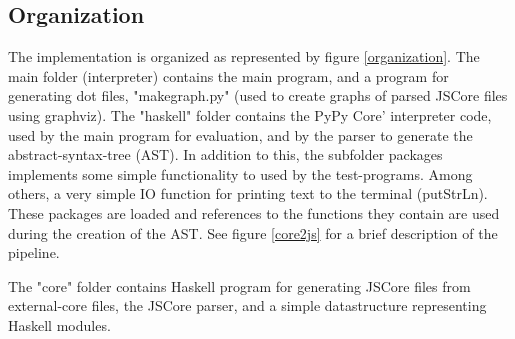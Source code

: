 




\subsection{Organization}

The implementation is organized as represented by figure \ref{organization}. The
main folder (interpreter) contains the main program, and a program for generating
dot files, "makegraph.py" (used to create graphs of parsed JSCore files using graphviz). 
The "haskell" folder
contains the PyPy Core' interpreter code, used by the main program for evaluation, 
and by the parser to generate the abstract-syntax-tree (AST). In addition to this,
the subfolder packages implements some simple functionality to used by the test-programs.
Among others, a very simple IO function for printing text to the terminal (putStrLn).
These packages are loaded and references to the functions they contain are used during
the creation of the AST. See figure \ref{core2js} for a brief description of the pipeline.

The "core" folder contains Haskell program for generating JSCore files from external-core
files, the JSCore parser, and a simple datastructure representing Haskell modules.

